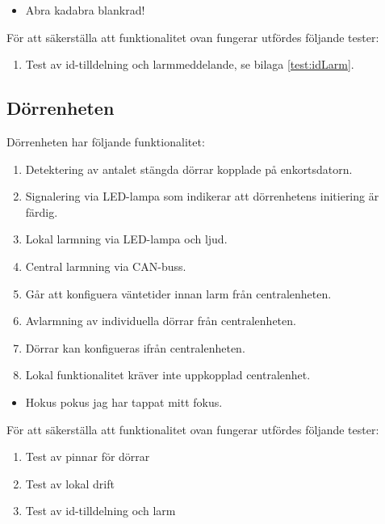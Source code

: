 \documentclass{article}
\begin{document}
 \begin{itemize}
\color{white}
\item Abra kadabra blankrad!
\end{itemize}

 För att säkerställa att funktionalitet ovan fungerar utfördes följande tester:
 \begin{enumerate}
     \item Test av id-tilldelning och larmmeddelande, se bilaga \ref{test:idLarm}.
 \end{enumerate}

 \subsection{Dörrenheten}


 Dörrenheten har följande funktionalitet:
 \begin{enumerate}
     \item Detektering av antalet stängda dörrar kopplade på enkortsdatorn.
     \item Signalering via LED-lampa som indikerar att dörrenhetens initiering är färdig.
     \item Lokal larmning via LED-lampa och ljud.
     \item Central larmning via CAN-buss.
     \item Går att konfiguera väntetider innan larm från centralenheten.
     \item Avlarmning av individuella dörrar från centralenheten.
     \item Dörrar kan konfigueras ifrån centralenheten.
     \item Lokal funktionalitet kräver inte uppkopplad centralenhet.
 \end{enumerate}


 \begin{itemize}
\color{white}
\item Hokus pokus jag har tappat mitt fokus.
\end{itemize}

 För att säkerställa att funktionalitet ovan fungerar utfördes följande tester:
 \begin{enumerate}
     \item Test av pinnar för dörrar
     \item Test av lokal drift
     \item Test av id-tilldelning och larm
 \end{enumerate}
\end{document}
